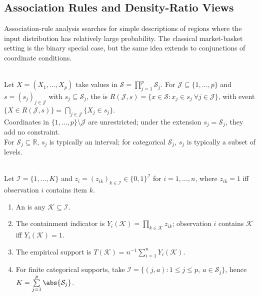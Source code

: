 \subsection{Association Rules and Density-Ratio Views}

Association-rule analysis searches for simple descriptions of regions where the input distribution has relatively large probability.  The classical market-basket setting is the binary special case, but the same idea extends to conjunctions of coordinate conditions.

\begin{definition} \label{def:sl-conjunctive-region} \\
Let $X=(X_1,\ldots,X_p)$ take values in $\mathcal{S}=\prod_{j=1}^p\mathcal{S}_j$. For $\mathcal{J}\subseteq\{1,\ldots,p\}$ and $s=(s_j)_{j\in\mathcal{J}}$ with $s_j\subseteq\mathcal{S}_j$, the  is $R(\mathcal{J},s)=\{x\in\mathcal{S}:x_j\in s_j\ \forall j\in\mathcal{J}\}$, with event $\{X\in R(\mathcal{J},s)\}=\bigcap\limits_{j\in\mathcal{J}}\{X_j\in s_j\}$.\\
Coordinates in $\{1,\ldots,p\}\setminus\mathcal{J}$ are unrestricted; under the extension $s_j=\mathcal{S}_j$, they add no constraint.\\
For $\mathcal{S}_j\subseteq\mathbb{R}$, $s_j$ is typically an interval; for categorical $\mathcal{S}_j$, $s_j$ is typically a subset of levels.
\end{definition}

\begin{definition} \label{def:sl-market-basket-itemset-support} \\
Let $\mathcal{I}=\{1,\ldots,K\}$ and $z_i=(z_{ik})_{k\in\mathcal{I}}\in\{0,1\}^{\mathcal{I}}$ for $i=1,\ldots,n$, where $z_{ik}=1$ iff observation $i$ contains item $k$.
\begin{enumerate}[label=(\roman*)]
\setlength{\itemsep}{0pt}
\item An  is any $\mathcal{K}\subseteq\mathcal{I}$.
\item The containment indicator is $Y_i(\mathcal{K})=\prod\limits_{k\in\mathcal{K}}z_{ik}$; observation $i$ contains $\mathcal{K}$ iff $Y_i(\mathcal{K})=1$.
\item The empirical support is $T(\mathcal{K})=n^{-1}\sum\limits_{i=1}^nY_i(\mathcal{K})$.
\item For finite categorical supports, take $\mathcal{I}=\{(j,a):1\leq j\leq p,\ a\in\mathcal{S}_j\}$, hence $K=\sum\limits_{j=1}^p\abs{\mathcal{S}_j}$.
\end{enumerate}
\end{definition}

